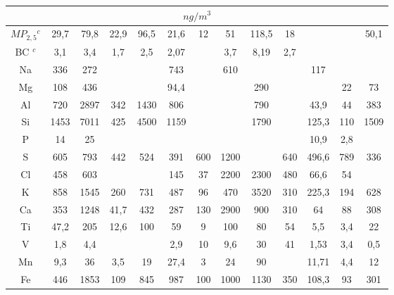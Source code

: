 \begin{tabular}{ccccccccccccc}
\hline
\multicolumn{13}{c}{$ng / m^3$} \\
\hline
$MP_{2,5} {^c}$&29,7   & 79,8       & 22,9             & 96,5 &21,6   & 12     & 51    & 118,5 & 18    &        &         & 50,1  \\
BC $^c$   & 3,1        & 3,4        & 1,7              & 2,5  &2,07   &        & 3,7   & 8,19  & 2,7   &        &         &       \\
Na        & 336        & 272        &                  &      &743    &        & 610   &       &       & 117    &         &       \\
Mg        & 108        & 436        &                  &      &94,4   &        &       & 290   &       &        & 22      & 73    \\
Al        & 720        & 2897       & 342              & 1430 &806    &        &       & 790   &       & 43,9   & 44      & 383   \\
Si        & 1453       & 7011       & 425              & 4500 &1159   &        &       & 1790  &       & 125,3  & 110     & 1509  \\
P         & 14         & 25         &                  &      &       &        &       &       &       & 10,9   & 2,8     &       \\
S         & 605        & 793        & 442              & 524  &391    & 600    & 1200  &       & 640   & 496,6  & 789     & 336   \\
Cl        & 458        & 603        &                  &      &145    & 37     & 2200  & 2300  & 480   & 66,6   & 54      &       \\
K         & 858        & 1545       & 260              & 731  &487    & 96     & 470   & 3520  & 310   & 225,3  & 194     & 628   \\
Ca        & 353        & 1248       & 41,7             & 432  &287    & 130    & 2900  & 900   & 310   & 64     & 88      & 308   \\
Ti        & 47,2       & 205        & 12,6             & 100  &59     & 9      & 100   & 80    & 54    & 5,5    & 3,4     & 22    \\
V         & 1,8        & 4,4        &                  &      &2,9    & 10     & 9,6   & 30    & 41    & 1,53   & 3,4     & 0,5   \\
Mn        & 9,3        & 36         & 3,5              & 19   &27,4   & 3      & 24    & 90    &       & 11,71  & 4,4     & 12    \\
Fe        & 446        & 1853       & 109              & 845  &987    & 100    & 1000  & 1130  & 350   & 108,3  & 93      & 301   \\

\end{tabular}
